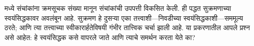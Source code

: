 \documentclass[../../../include/open-logic-section]{subfiles}
\begin{document}


 मध्ये संचांकांना क्रमसूचक संख्या मानून संचांकांची उपपत्ती विकसित केली. ही पद्धत सुक्रमणाच्या स्वयंसिद्धकावर अवलंबून आहे. सुक्रमण हे दुसऱ्या एका तत्त्वाशी---निवडीच्या स्वयंसिद्धकाशी---सममूल्य ठरते; आणि त्या तत्त्वाच्या स्वीकारार्हतेविषयी गंभीर तात्त्विक चर्चा झाली आहे. या प्रकरणातील आपले प्रश्न असे आहेत: हे स्वयंसिद्धक कसे वापरले जाते आणि त्याचे समर्थन करता येते का?
\end{document}
